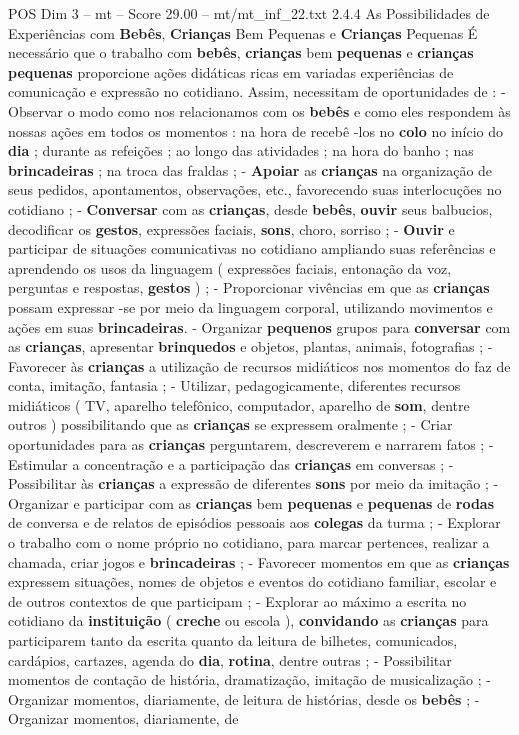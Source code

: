 \begin{textsample}{POS Dim 3 – mt – Score 29.00 – mt/mt\_inf\_22.txt}  \label{ex:f3_pos_076}
2.4.4 As Possibilidades de Experiências com \textbf{Bebês}, \textbf{Crianças} Bem Pequenas e \textbf{Crianças} Pequenas É necessário que o trabalho com \textbf{bebês}, \textbf{crianças} bem \textbf{pequenas} e \textbf{crianças} \textbf{pequenas} proporcione ações didáticas ricas em variadas experiências de comunicação e expressão no cotidiano.
Assim, necessitam de oportunidades de : - Observar o modo como nos relacionamos com os \textbf{bebês} e como eles respondem às nossas ações em todos os momentos : na hora de recebê -los no \textbf{colo} no início do \textbf{dia} ; durante as refeições ; ao longo das atividades ; na hora do banho ; nas \textbf{brincadeiras} ; na troca das fraldas ; - \textbf{Apoiar} as \textbf{crianças} na organização de seus pedidos, apontamentos, observações, etc., favorecendo suas interlocuções no cotidiano ; - \textbf{Conversar} com as \textbf{crianças}, desde \textbf{bebês}, \textbf{ouvir} seus balbucios, decodificar os \textbf{gestos}, expressões faciais, \textbf{sons}, choro, sorriso ; - \textbf{Ouvir} e participar de situações comunicativas no cotidiano ampliando suas referências e aprendendo os usos da linguagem ( expressões faciais, entonação da voz, perguntas e respostas, \textbf{gestos} ) ; - Proporcionar vivências em que as \textbf{crianças} possam expressar -se por meio da linguagem corporal, utilizando movimentos e ações em suas \textbf{brincadeiras}. - Organizar \textbf{pequenos} grupos para \textbf{conversar} com as \textbf{crianças}, apresentar \textbf{brinquedos} e objetos, plantas, animais, fotografias ; - Favorecer às \textbf{crianças} a utilização de recursos midiáticos nos momentos do faz de conta, imitação, fantasia ; - Utilizar, pedagogicamente, diferentes recursos midiáticos ( TV, aparelho telefônico, computador, aparelho de \textbf{som}, dentre outros ) possibilitando que as \textbf{crianças} se expressem oralmente ; - Criar oportunidades para as \textbf{crianças} perguntarem, descreverem e narrarem fatos ; - Estimular a concentração e a participação das \textbf{crianças} em conversas ; - Possibilitar às \textbf{crianças} a expressão de diferentes \textbf{sons} por meio da imitação ; - Organizar e participar com as \textbf{crianças} bem \textbf{pequenas} e \textbf{pequenas} de \textbf{rodas} de conversa e de relatos de episódios pessoais aos \textbf{colegas} da turma ; - Explorar o trabalho com o nome próprio no cotidiano, para marcar pertences, realizar a chamada, criar jogos e \textbf{brincadeiras} ; - Favorecer momentos em que as \textbf{crianças} expressem situações, nomes de objetos e eventos do cotidiano familiar, escolar e de outros contextos de que participam ; - Explorar ao máximo a escrita no cotidiano da \textbf{instituição} ( \textbf{creche} ou escola ), \textbf{convidando} as \textbf{crianças} para participarem tanto da escrita quanto da leitura de bilhetes, comunicados, cardápios, cartazes, agenda do \textbf{dia}, \textbf{rotina}, dentre outras ; - Possibilitar momentos de contação de história, dramatização, imitação de musicalização ; - Organizar momentos, diariamente, de leitura de histórias, desde os \textbf{bebês} ; - Organizar momentos, diariamente, de 
\end{textsample}
